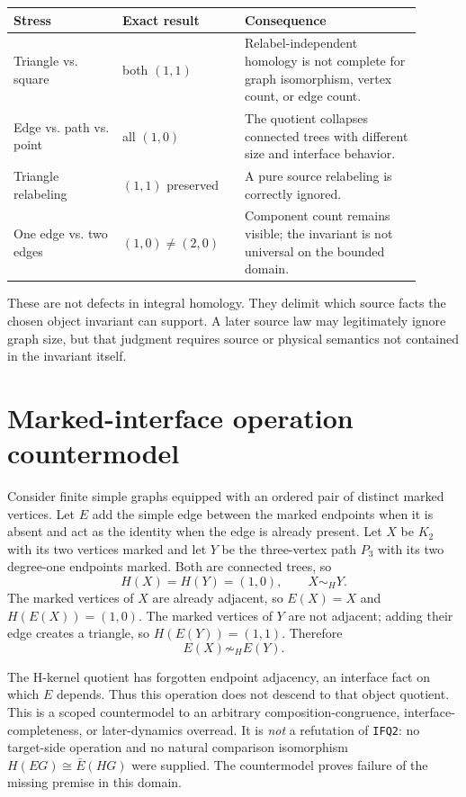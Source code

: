 \documentclass[11pt]{article}
\begin{document}
\begin{center}
\begin{tabular}{>{\raggedright\arraybackslash}p{0.24\linewidth}
                >{\raggedright\arraybackslash}p{0.27\linewidth}
                >{\raggedright\arraybackslash}p{0.39\linewidth}}
\toprule
Stress & Exact result & Consequence \\
\midrule
Triangle vs. square & both \((1,1)\) & Relabel-independent homology is not
complete for graph isomorphism, vertex count, or edge count. \\
Edge vs. path vs. point & all \((1,0)\) & The quotient collapses connected
trees with different size and interface behavior. \\
Triangle relabeling & \((1,1)\) preserved & A pure source relabeling is
correctly ignored. \\
One edge vs. two edges & \((1,0)\ne(2,0)\) & Component count remains visible;
the invariant is not universal on the bounded domain. \\
\bottomrule
\end{tabular}
\end{center}

These are not defects in integral homology.  They delimit which source facts
the chosen object invariant can support.  A later source law may legitimately
ignore graph size, but that judgment requires source or physical semantics not
contained in the invariant itself.

\section{Marked-interface operation countermodel}

Consider finite simple graphs equipped with an ordered pair of distinct marked
vertices.  Let \(E\) add the simple edge between the marked endpoints when it
is absent and act as the identity when the edge is already present.  Let
\(X\) be \(K_2\) with its two vertices marked and let \(Y\) be the
three-vertex path \(P_3\) with its two degree-one endpoints marked.  Both are
connected trees, so
\[
 H(X)=H(Y)=(1,0), \qquad X\sim_HY.
\]
The marked vertices of \(X\) are already adjacent, so \(E(X)=X\) and
\(H(E(X))=(1,0)\).  The marked vertices of \(Y\) are not adjacent; adding
their edge creates a triangle, so \(H(E(Y))=(1,1)\).  Therefore
\[
 E(X)\not\sim_H E(Y).
\]

The H-kernel quotient has forgotten endpoint adjacency, an interface fact on
which \(E\) depends.  Thus this operation does not descend to that object
quotient.  This is a scoped countermodel to an arbitrary
composition-congruence, interface-completeness, or later-dynamics overread.
It is \emph{not} a refutation of \texttt{IFQ2}: no target-side operation and
no natural comparison isomorphism \(H(EG)\cong\bar E(HG)\) were supplied.
The countermodel proves failure of the missing premise in this domain.
\end{document}
